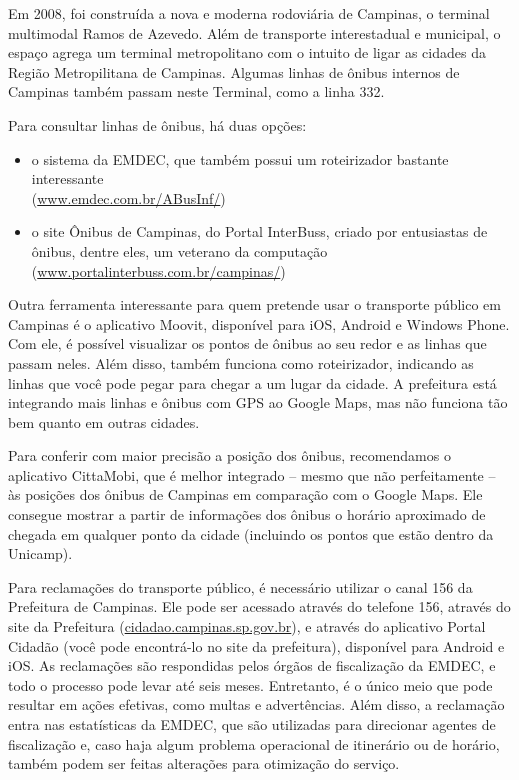 Em 2008, foi construída a nova e moderna rodoviária de Campinas, o terminal
multimodal Ramos de Azevedo. Além de transporte interestadual e municipal, o
espaço agrega um terminal metropolitano com o intuito de ligar as cidades da
Região Metropilitana de Campinas. Algumas linhas de ônibus internos de Campinas
também passam neste Terminal, como a linha 332.

Para consultar linhas de ônibus, há duas opções:
\begin{itemize}
\item o sistema da EMDEC, que também possui um roteirizador bastante
  interessante
  \\(\url{www.emdec.com.br/ABusInf/})
\item o site Ônibus de Campinas, do Portal InterBuss, criado por entusiastas
  de ônibus, dentre eles, um veterano da computação
  \\(\url{www.portalinterbuss.com.br/campinas/})
\end{itemize}

Outra ferramenta interessante para quem pretende usar o transporte público em
Campinas é o aplicativo Moovit, disponível para iOS, Android e Windows
Phone. Com ele, é possível visualizar os pontos de ônibus ao seu redor e as
linhas que passam neles. Além disso, também funciona como roteirizador,
indicando as linhas que você pode pegar para chegar a um lugar da cidade. A
prefeitura está integrando mais linhas e ônibus com GPS ao Google Maps, mas não
funciona tão bem quanto em outras cidades.

Para conferir com maior precisão a posição dos ônibus, recomendamos o
aplicativo CittaMobi, que é melhor integrado -- mesmo que não perfeitamente --
às posições dos ônibus de Campinas em comparação com o Google Maps. Ele
consegue mostrar a partir de informações dos ônibus o horário aproximado de
chegada em qualquer ponto da cidade (incluindo os pontos que estão dentro da
Unicamp).

Para reclamações do transporte público, é necessário utilizar o canal 156 da
Prefeitura de Campinas. Ele pode ser acessado através do telefone 156, através
do site da Prefeitura (\url{cidadao.campinas.sp.gov.br}), e através do
aplicativo Portal Cidadão (você pode encontrá-lo no site da prefeitura),
disponível para Android e iOS. As reclamações são respondidas pelos órgãos de
fiscalização da EMDEC, e todo o processo pode levar até seis meses. Entretanto,
é o único meio que pode resultar em ações efetivas, como multas e advertências.
Além disso, a reclamação entra nas estatísticas da EMDEC, que são utilizadas
para direcionar agentes de fiscalização e, caso haja algum problema operacional
de itinerário ou de horário, também podem ser feitas alterações para otimização
do serviço.

